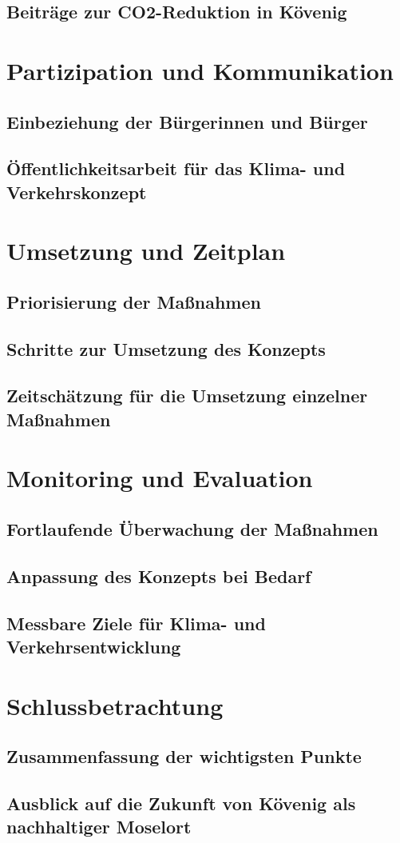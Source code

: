 \subsection{Beiträge zur CO2-Reduktion in Kövenig}

\section{Partizipation und Kommunikation}
\subsection{Einbeziehung der Bürgerinnen und Bürger}
\subsection{Öffentlichkeitsarbeit für das Klima- und Verkehrskonzept}

\section{Umsetzung und Zeitplan}
\subsection{Priorisierung der Maßnahmen}
\subsection{Schritte zur Umsetzung des Konzepts}
\subsection{Zeitschätzung für die Umsetzung einzelner Maßnahmen}

\section{Monitoring und Evaluation}
\subsection{Fortlaufende Überwachung der Maßnahmen}
\subsection{Anpassung des Konzepts bei Bedarf}
\subsection{Messbare Ziele für Klima- und Verkehrsentwicklung}

\section{Schlussbetrachtung}
\subsection{Zusammenfassung der wichtigsten Punkte}
\subsection{Ausblick auf die Zukunft von Kövenig als nachhaltiger Moselort}

